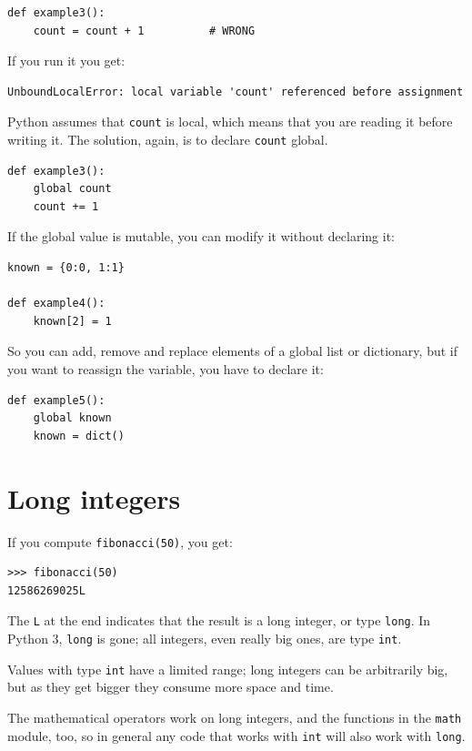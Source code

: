 \documentclass[10pt]{book}
\begin{document}
\begin{CJK}{UTF8}{gbsn}
\begin{verbatim}
def example3():
    count = count + 1          # WRONG
\end{verbatim}
%
If you run it you get:

\begin{verbatim}
UnboundLocalError: local variable 'count' referenced before assignment
\end{verbatim}
%
Python assumes that {\tt count} is local, which means
that you are reading it before writing it.  The solution, again,
is to declare {\tt count} global.

\begin{verbatim}
def example3():
    global count
    count += 1
\end{verbatim}
%
If the global value is mutable, you can modify it without
declaring it:

\begin{verbatim}
known = {0:0, 1:1}

def example4():
    known[2] = 1
\end{verbatim}
%
So you can add, remove and replace elements of a global list or
dictionary, but if you want to reassign the variable, you
have to declare it:

\begin{verbatim}
def example5():
    global known
    known = dict()
\end{verbatim}
%

\section{Long integers}

If you compute {\tt fibonacci(50)}, you get:

\begin{verbatim}
>>> fibonacci(50)
12586269025L
\end{verbatim}
%
The {\tt L} at the end indicates that the result is a long
integer, or type {\tt long}.  In Python 3, {\tt long} is gone; all integers,
even really big ones, are type {\tt int}.

Values with type {\tt int} have a limited range;
long integers can be arbitrarily big, but as they get bigger
they consume more space and time.

The mathematical operators work on long integers, and the functions
in the {\tt math} module, too, so in general any code that
works with {\tt int} will also work with {\tt long}.


\end{CJK}
\end{document}

